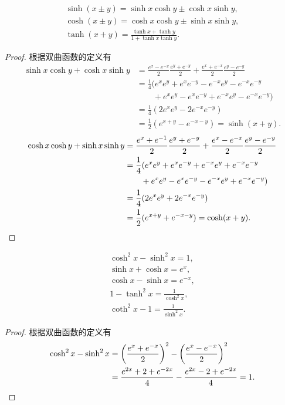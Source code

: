 \begin{theorem}
\begin{gather}
	\sinh(x \pm y) = \sinh x\cosh y \pm \cosh x\sinh y, \\
	\cosh(x \pm y) = \cosh x\cosh y \pm \sinh x\sinh y, \\
	\tanh(x + y) = \frac{\tanh x + \tanh y}{1 + \tanh x\tanh y}.
\end{gather}
\begin{proof}
根据双曲函数的定义有
\begin{align*}
	\sinh x\cosh y+\cosh x\sinh y
	&= \frac{e^x - e^{-x}}{2} \frac{e^y + e^{-y}}{2} + \frac{e^x + e^{-x}}{2} \frac{e^y - e^{-y}}{2} \\
	&= \frac{1}{4} (e^x e^y + e^x e^{-y} - e^{-x} e^y - e^{-x} e^{-y} \\
	&\qquad+ e^x e^y - e^x e^{-y} + e^{-x} e^y - e^{-x} e^{-y}) \\
	&= \frac{1}{4} (2 e^x e^y - 2 e^{-x} e^{-y}) \\
	&= \frac{1}{2} (e^{x+y} - e^{-x-y}) = \sinh(x+y).
\end{align*}
\begin{align*}
	\cosh x\cosh y+\sinh x\sinh y
	&= \frac{e^x + e^{-1}}{2} \frac{e^y + e^{-y}}{2} + \frac{e^x - e^{-x}}{2} \frac{e^y - e^{-y}}{2} \\
	&= \frac{1}{4} (e^x e^y + e^x e^{-y} + e^{-x} e^y + e^{-x} e^{-y} \\
	&\qquad+ e^x e^y - e^x e^{-y} - e^{-x} e^y + e^{-x} e^{-y}) \\
	&= \frac{1}{4} (2 e^x e^y + 2 e^{-x} e^{-y}) \\
	&= \frac{1}{2} (e^{x+y} + e^{-x-y}) = \cosh(x+y).
	\qedhere
\end{align*}
\end{proof}
\end{theorem}

\begin{theorem}
\begin{gather}
	\cosh^2x - \sinh^2x = 1, \\
	\sinh x + \cosh x = e^x, \\
	\cosh x - \sinh x = e^{-x}, \\
	1 - \tanh^2{x} = \frac{1}{\cosh^2x}, \\
	\coth^2{x} - 1 = \frac{1}{\sinh^2x}.
\end{gather}
\begin{proof}
根据双曲函数的定义有
\begin{align*}
	\cosh^2x-\sinh^2x
	&=\left(\frac{e^x + e^{-x}}{2}\right)^2-\left(\frac{e^x - e^{-x}}{2}\right)^2 \\
	&=\frac{e^{2x}+2+e^{-2x}}{4}-\frac{e^{2x}-2+e^{-2x}}{4}
	=1.
	\qedhere
\end{align*}
\end{proof}
\end{theorem}

